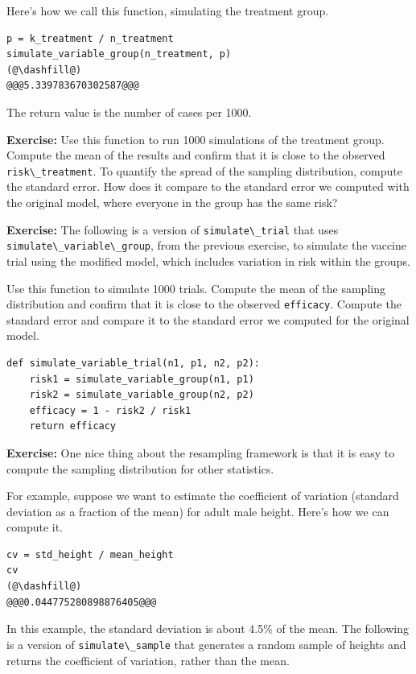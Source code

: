 Here's how we call this function, simulating the treatment group.

\begin{lstlisting}[]
p = k_treatment / n_treatment
simulate_variable_group(n_treatment, p)
(@\dashfill@)
@@@5.339783670302587@@@
\end{lstlisting}

The return value is the number of cases per 1000.

\textbf{Exercise:} Use this function to run 1000 simulations of the
treatment group. Compute the mean of the results and confirm that it is
close to the observed \passthrough{\lstinline!risk\_treatment!}. To
quantify the spread of the sampling distribution, compute the standard
error. How does it compare to the standard error we computed with the
original model, where everyone in the group has the same risk?

\textbf{Exercise:} The following is a version of
\passthrough{\lstinline!simulate\_trial!} that uses
\passthrough{\lstinline!simulate\_variable\_group!}, from the previous
exercise, to simulate the vaccine trial using the modified model, which
includes variation in risk within the groups.

Use this function to simulate 1000 trials. Compute the mean of the
sampling distribution and confirm that it is close to the observed
\passthrough{\lstinline!efficacy!}. Compute the standard error and
compare it to the standard error we computed for the original model.

\begin{lstlisting}[]
def simulate_variable_trial(n1, p1, n2, p2):
    risk1 = simulate_variable_group(n1, p1)
    risk2 = simulate_variable_group(n2, p2)
    efficacy = 1 - risk2 / risk1
    return efficacy
\end{lstlisting}

\textbf{Exercise:} One nice thing about the resampling framework is that
it is easy to compute the sampling distribution for other statistics.

For example, suppose we want to estimate the coefficient of variation
(standard deviation as a fraction of the mean) for adult male height.
Here's how we can compute it.

\begin{lstlisting}[]
cv = std_height / mean_height
cv
(@\dashfill@)
@@@0.044775280898876405@@@
\end{lstlisting}

In this example, the standard deviation is about 4.5\% of the mean. The
following is a version of \passthrough{\lstinline!simulate\_sample!}
that generates a random sample of heights and returns the coefficient of
variation, rather than the mean.

